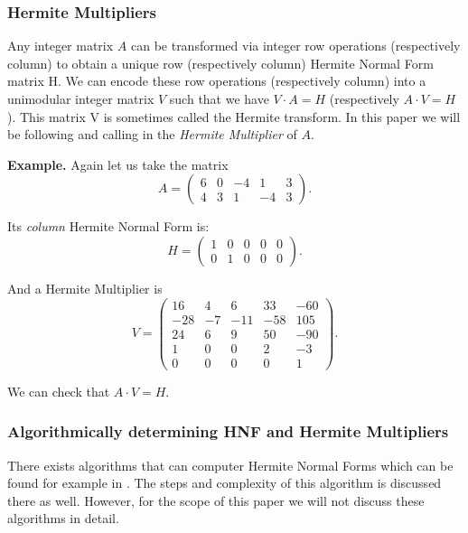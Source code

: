 \documentclass[oneside, a4paper, onecolumn, 11pt]{article}
\newenvironment{example}[1][Example]{\textbf{#1.} }{\medskip}
\begin{document}
\subsubsection{Hermite Multipliers}

Any integer matrix \(A\) can be transformed via integer row operations (respectively column) to obtain a unique row (respectively column) Hermite Normal Form matrix H. We can encode these row operations (respectively column) into a unimodular integer matrix \(V\) such that we have \(V \cdot A = H\) (respectively \(A \cdot V = H\)). This matrix V is sometimes called the Hermite transform. In this paper we will be following \cite{Hubert2013} and calling in the \textit{Hermite Multiplier} of \(A\).

\begin{example}
    Again let us take the matrix
    \[
        A = \begin{pmatrix}
            6 & 0 & -4 & 1  & 3 \\
            4 & 3 & 1  & -4 & 3
        \end{pmatrix}.
    \]

    Its \textit{column} Hermite Normal Form is:
    \[
        H = \begin{pmatrix}
            1 & 0 & 0 & 0 & 0 \\
            0 & 1 & 0 & 0 & 0
        \end{pmatrix}.
    \]

    And a Hermite Multiplier is
    \[
        V = \begin{pmatrix}
            16  & 4  & 6   & 33  & -60 \\
            -28 & -7 & -11 & -58 & 105 \\
            24  & 6  & 9   & 50  & -90 \\
            1   & 0  & 0   & 2   & -3  \\
            0   & 0  & 0   & 0   & 1
        \end{pmatrix}.
    \]

    We can check that \(A \cdot V = H\).
\end{example}


\subsubsection{Algorithmically determining HNF and Hermite Multipliers}

There exists algorithms that can computer Hermite Normal Forms which can be found for example in \cite{cohen2013course}. The steps and complexity of this algorithm is discussed there as well. However, for the scope of this paper we will not discuss these algorithms in detail.
\end{document}
